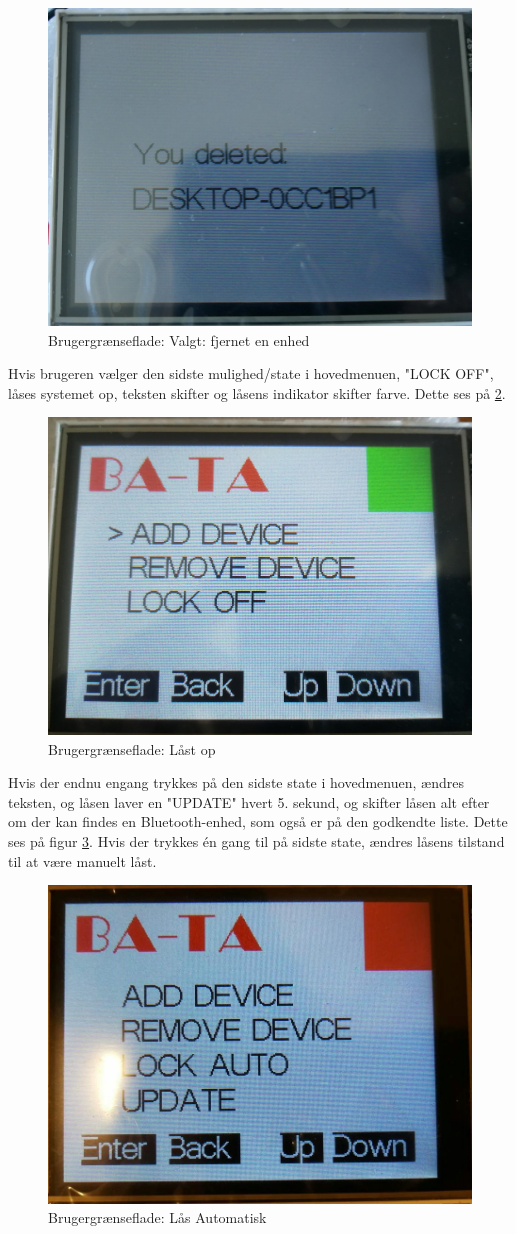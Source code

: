 \begin{figure}[H]
	\centering
	\includegraphics[width = 300 pt]{Img/delete.jpg}
	\caption{Brugergrænseflade: Valgt: fjernet en enhed}
	\label{fig:delete}
\end{figure}
Hvis brugeren vælger den sidste mulighed/state i hovedmenuen, "LOCK OFF", låses systemet op, teksten skifter og låsens indikator skifter farve. Dette ses på \ref{fig:lockOff}.
\begin{figure}[H]
	\centering
	\includegraphics[width = 300 pt]{Img/lockOff.jpg}
	\caption{Brugergrænseflade: Låst op}
	\label{fig:lockOff}
\end{figure}
Hvis der endnu engang trykkes på den sidste state i hovedmenuen, ændres teksten, og låsen laver en "UPDATE"  hvert 5. sekund, og skifter låsen alt efter om der kan findes en Bluetooth-enhed, som også er på den godkendte liste. Dette ses på figur \ref{fig:auto}. Hvis der trykkes én gang til på sidste state, ændres låsens tilstand til at være manuelt låst.
\begin{figure}[H]
	\centering
	\includegraphics[width = 300 pt]{Img/auto.jpg}
	\caption{Brugergrænseflade: Lås Automatisk}
	\label{fig:auto}
\end{figure}

